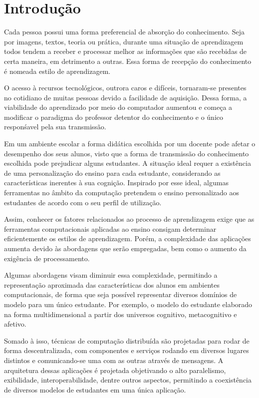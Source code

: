 \chapter{Introdução}

Cada pessoa possui uma forma preferencial de absorção do conhecimento. Seja por imagens, textos, teoria ou prática, durante uma situação de aprendizagem todos tendem a receber e processar melhor as informações que são recebidas de certa maneira, em detrimento a outras. Essa forma de recepção do conhecimento é nomeada estilo de aprendizagem.
 
O acesso à recursos tecnológicos, outrora caros e difíceis, tornaram-se presentes no cotidiano de muitas pessoas devido a facilidade de aquisição. Dessa forma, a viabilidade do aprendizado por meio do computador aumentou e começa a modificar o paradigma do professor detentor do conhecimento e o único responśavel pela sua transmissão.

Em um ambiente escolar a forma didática escolhida por um docente pode afetar o desempenho dos seus alunos, visto que a forma de transmissão do conhecimento escolhida pode prejudicar alguns estudantes. A situação ideal requer a existência de uma personalização do ensino para cada estudante, considerando as características inerentes à sua cognição. Inspirado por esse ideal, algumas ferramentas no âmbito da computação pretendem o ensino personalizado aos estudantes de acordo com o seu perfil de utilização.

Assim, conhecer os fatores relacionados ao processo de aprendizagem exige que as ferramentas computacionais aplicadas ao ensino consigam determinar eficientemente os estilos de aprendizagem. Porém, a complexidade das aplicações aumenta devido às abordagens que serão empregadas, bem como o aumento da exigência de processamento.

Algumas abordagens visam diminuir essa complexidade, permitindo a representação aproximada das características dos alunos em ambientes computacionais, de forma que seja possível representar diversos domínios de modelo para um único estudante. Por exemplo, o modelo do estudante elaborado na forma multidimensional a partir dos universos cognitivo, metacognitivo e afetivo.

Somado à isso, técnicas de computação distribuída são projetadas para rodar de forma descentralizada, com componentes e serviços rodando em diversos lugares distintos e comunicando-se uma com as outras através de mensagens. A arquitetura dessas aplicações é projetada objetivando o alto paralelismo, exibilidade, interoperabilidade, dentre outros aspectos, permitindo a coexistência de diversos modelos de estudantes em uma única aplicação.

